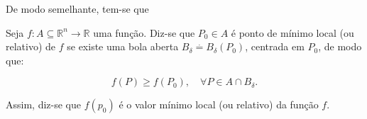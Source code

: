 De modo semelhante, tem-se que

\begin{definition}
	Seja $ f: A \subseteq \mathbb{R}^{n} \rightarrow \mathbb{R} $ uma função. Diz-se que $ P_{0} \in A $ é ponto de mínimo local (ou relativo) de $ f $ se existe uma bola aberta $ B_{\delta} \overset{\cdot}{=} B_{\delta}(P_{0})$, centrada em $ P_{0} $, de modo que:
	
	\begin{equation*}
		f(P) \geq f(P_{0}), \quad \forall P \in A \cap B_{\delta}.
	\end{equation*}
	
	Assim, diz-se que $ f(p_{0}) $ é o valor mínimo local (ou relativo) da função $ f $.
\end{definition}
